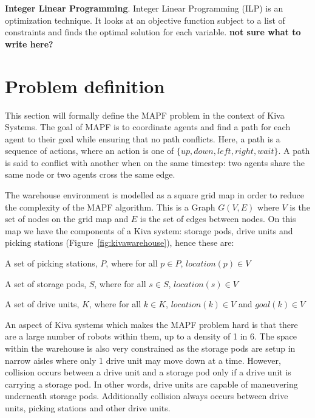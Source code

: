 \documentclass[a4paper,11pt]{article}
\begin{document}
\noindent \textbf{Integer Linear Programming}. Integer Linear Programming (ILP) is an optimization technique. It looks at an objective function subject to a list of constraints and finds the optimal solution for each variable. \textbf{not sure what to write here?}

%

\section{Problem definition} \label{sec:problemdef}
This section will formally define the MAPF problem in the context of Kiva Systems. The goal of MAPF is to coordinate agents and find a path for each agent to their goal while ensuring that no path conflicts. Here, a path is a sequence of actions, where an action is one of $\{up, down, left, right, wait\}$. A path is said to conflict with another when on the same timestep: two agents share the same node or two agents cross the same edge.

The warehouse environment is modelled as a square grid map in order to reduce the complexity of the MAPF algorithm. This is a  Graph $G(V, E)$ where $V$ is the set of nodes on the grid map and $E$ is the set of edges between nodes. On this map we have the components of a Kiva system: storage pods, drive units and picking stations (Figure~\ref{fig:kivawarehouse}), hence these are:
\begin{compactitem}
	\item A set of picking stations, $P$, where for all $p \in P$, $location (p) \in V$
	\item A set of storage pods, $S$, where for all $s \in S$, $location (s) \in V$
	\item A set of drive units, $K$, where for all $k \in K$, $location(k) \in V$ and $goal(k) \in V$
\end{compactitem}

An aspect of Kiva systems which makes the MAPF problem hard is that there are a large number of robots within them, up to a density of 1 in 6. The space within the warehouse is also very constrained as the storage pods are setup in narrow aisles where only 1 drive unit may move down at a time. However, collision occurs between a drive unit and a storage pod only if a drive unit is carrying a storage pod. In other words, drive units are capable of maneuvering underneath storage pods. Additionally collision always occurs between drive units, picking stations and other drive units.
\end{document}
